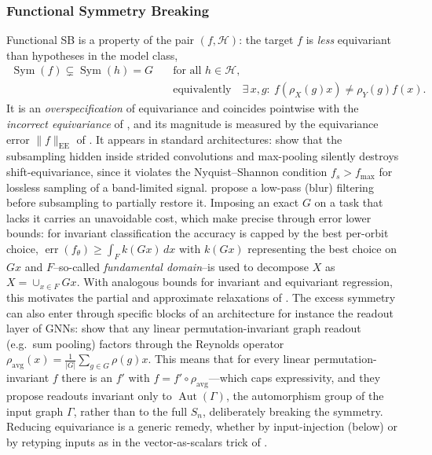 \documentclass[mathematics,review,submit,moreauthors]{Definitions/mdpi}
\begin{document}
\subsubsection{Functional Symmetry Breaking}
Functional SB is a property of the pair $(f,\mathcal{H})$: the target $f$ is \emph{less} equivariant than hypotheses in the model class,
\begin{align}
\operatorname{Sym}(f)\subsetneq\operatorname{Sym}(h)=G\quad&\text{for all }h\in\mathcal{H},\\
&\text{equivalently}\quad \exists\,x,g:\ f(\rho_X(g)x)\neq\rho_Y(g)f(x).
\end{align}
It is an \emph{overspecification} of equivariance and coincides pointwise with the \emph{incorrect equivariance} of \citet{wang2023a}, and its magnitude is measured by the equivariance error $\|f\|_{\mathrm{EE}}$ of .
It appears in standard architectures: \citet{zhang2019p3icml} show that the subsampling hidden inside strided convolutions and max-pooling silently destroys shift-equivariance, since it violates the Nyquist--Shannon condition $f_s>f_{\max}$ for lossless sampling of a band-limited signal.
\citet{zhang2019p3icml} propose a low-pass (blur) filtering before subsampling to partially restore it.
Imposing an exact $G$ on a task that lacks it carries an unavoidable cost, which \citet{wang2023a} make precise through error lower bounds: for invariant classification the accuracy is capped by the best per-orbit choice, $\operatorname{err}(f_\theta)\ge\int_F k(Gx)\,dx$ with $k(Gx)$ representing the best choice on $Gx$ and $F$--so-called \emph{fundamental domain}--is used to decompose $X$ as $X=\cup_{x\in F}Gx$.
With analogous bounds for invariant and equivariant regression, this motivates the partial and approximate relaxations of .
The excess symmetry can also enter through specific blocks of an architecture for instance the readout layer of GNNs: \citet{talhi2026} show that any linear permutation-invariant graph readout (e.g.\ sum pooling) factors through the Reynolds operator $\rho_{\mathrm{avg}}(x)=\frac{1}{|G|}\sum_{g\in G}\rho(g)x$.
This means that for every linear permutation-invariant $f$ there is an $f'$ with $f=f'\circ\rho_{\mathrm{avg}}$---which caps expressivity, and they propose readouts invariant only to $\operatorname{Aut}(\Gamma)$, the automorphism group of the input graph $\Gamma$, rather than to the full $S_n$, deliberately breaking the symmetry.
Reducing equivariance is a generic remedy, whether by input-injection (below) or by retyping inputs as in the vector-as-scalars trick of \citet{vadgama2025}.
\end{document}
